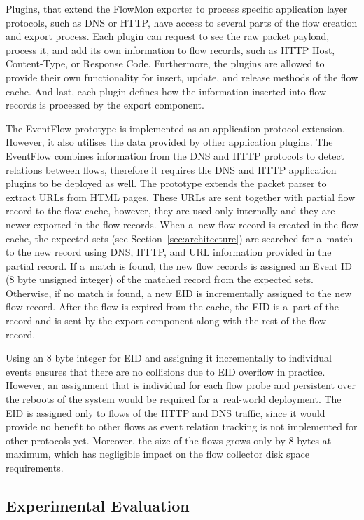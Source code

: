 Plugins, that extend the FlowMon exporter to process specific application layer protocols, such as DNS or HTTP, have access to several parts of the flow creation and export process. Each plugin can request to see the raw packet payload, process it, and add its own information to flow records, such as HTTP Host, Content-Type, or Response Code. Furthermore, the plugins are allowed to provide their own functionality for insert, update, and release methods of the flow cache. And last, each plugin defines how the information inserted into flow records is processed by the export component.

The EventFlow prototype is implemented as an application protocol extension. However, it also utilises the data provided by other application plugins. The EventFlow combines information from the DNS and HTTP protocols to detect relations between flows, therefore it requires the DNS and HTTP application plugins to be deployed as well. The prototype extends the packet parser to extract URLs from HTML pages. These URLs are sent together with partial flow record to the flow cache, however, they are used only internally and they are newer exported in the flow records. When a~new flow record is created in the flow cache, the expected sets (see Section~\ref{sec:architecture}) are searched for a~match to the new record using DNS, HTTP, and URL information provided in the partial record. If a~match is found, the new flow records is assigned an Event ID (8 byte unsigned integer) of the matched record from the expected sets. Otherwise, if no match is found, a new EID is incrementally assigned to the new flow record. After the flow is expired from the cache, the EID is a~part of the record and is sent by the export component along with the rest of the flow record.

Using an 8 byte integer for EID and assigning it incrementally to individual events ensures that there are no collisions due to EID overflow in practice. However, an assignment that is individual for each flow probe and persistent over the reboots of the system would be required for a~real-world deployment. The EID is assigned only to flows of the HTTP and DNS traffic, since it would provide no benefit to other flows as event relation tracking is not implemented for other protocols yet. Moreover, the size of the flows grows only by 8 bytes at maximum, which has negligible impact on the flow collector disk space requirements.


\subsection{Experimental Evaluation} \label{subsec:eventflow-evaluation}

